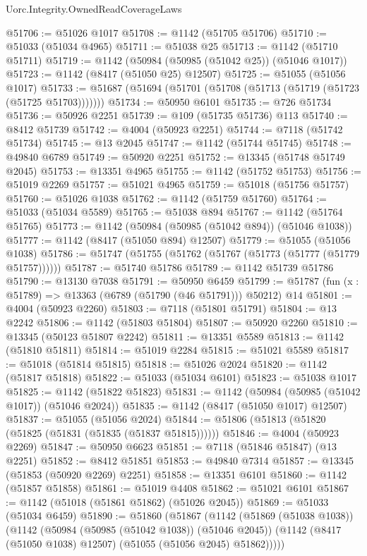 \begin{lexlean}{Uorc.Integrity.OwnedReadCoverageLaws}
\begin{coremodule}
@51706 := @51026 @1017
@51708 := @1142 (@51705 @51706)
@51710 := @51033 (@51034 @4965)
@51711 := @51038 @25
@51713 := @1142 (@51710 @51711)
@51719 := @1142 (@50984 (@50985 (@51042 @25)) (@51046 @1017))
@51723 := @1142 (@8417 (@51050 @25) @12507)
@51725 := @51055 (@51056 @1017)
@51733 := @51687 (@51694 (@51701 (@51708 (@51713 (@51719 (@51723 (@51725 @51703)))))))
@51734 := @50950 @6101
@51735 := @726 @51734
@51736 := @50926 @2251
@51739 := @109 (@51735 @51736) @113
@51740 := @8412 @51739
@51742 := @4004 (@50923 @2251)
@51744 := @7118 (@51742 @51734)
@51745 := @13 @2045
@51747 := @1142 (@51744 @51745)
@51748 := @49840 @6789
@51749 := @50920 @2251
@51752 := @13345 (@51748 @51749 @2045)
@51753 := @13351 @4965
@51755 := @1142 (@51752 @51753)
@51756 := @51019 @2269
@51757 := @51021 @4965
@51759 := @51018 (@51756 @51757)
@51760 := @51026 @1038
@51762 := @1142 (@51759 @51760)
@51764 := @51033 (@51034 @5589)
@51765 := @51038 @894
@51767 := @1142 (@51764 @51765)
@51773 := @1142 (@50984 (@50985 (@51042 @894)) (@51046 @1038))
@51777 := @1142 (@8417 (@51050 @894) @12507)
@51779 := @51055 (@51056 @1038)
@51786 := @51747 (@51755 (@51762 (@51767 (@51773 (@51777 (@51779 @51757))))))
@51787 := @51740 @51786
@51789 := @1142 @51739 @51786
@51790 := @13130 @7038
@51791 := @50950 @6459
@51799 := @51787 (fun (x : @51789) => @13363 (@6789 (@51790 (@46 @51791))) @50212) @14
@51801 := @4004 (@50923 @2260)
@51803 := @7118 (@51801 @51791)
@51804 := @13 @2242
@51806 := @1142 (@51803 @51804)
@51807 := @50920 @2260
@51810 := @13345 (@50123 @51807 @2242)
@51811 := @13351 @5589
@51813 := @1142 (@51810 @51811)
@51814 := @51019 @2284
@51815 := @51021 @5589
@51817 := @51018 (@51814 @51815)
@51818 := @51026 @2024
@51820 := @1142 (@51817 @51818)
@51822 := @51033 (@51034 @6101)
@51823 := @51038 @1017
@51825 := @1142 (@51822 @51823)
@51831 := @1142 (@50984 (@50985 (@51042 @1017)) (@51046 @2024))
@51835 := @1142 (@8417 (@51050 @1017) @12507)
@51837 := @51055 (@51056 @2024)
@51844 := @51806 (@51813 (@51820 (@51825 (@51831 (@51835 (@51837 @51815))))))
@51846 := @4004 (@50923 @2269)
@51847 := @50950 @6623
@51851 := @7118 (@51846 @51847) (@13 @2251)
@51852 := @8412 @51851
@51853 := @49840 @7314
@51857 := @13345 (@51853 (@50920 @2269) @2251)
@51858 := @13351 @6101
@51860 := @1142 (@51857 @51858)
@51861 := @51019 @4408
@51862 := @51021 @6101
@51867 := @1142 (@51018 (@51861 @51862) (@51026 @2045))
@51869 := @51033 (@51034 @6459)
@51890 := @51860
    (@51867
      (@1142
        (@51869 (@51038 @1038))
        (@1142
          (@50984 (@50985 (@51042 @1038)) (@51046 @2045))
          (@1142 (@8417 (@51050 @1038) @12507) (@51055 (@51056 @2045) @51862)))))

\end{coremodule}
\end{lexlean}
